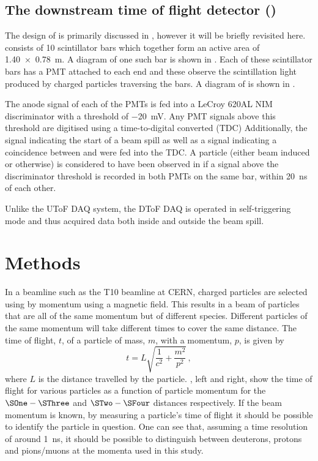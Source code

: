 \subsection{The downstream time of flight detector (\SFour)}
\label{sec:hptpc_beam_flux:overview:s4}

The design of \SFour is primarily discussed in , however it will be briefly revisited here.
\SFour consists of 10 scintillator bars which together form an active area of \SI{1.40 x 0.78}{\metre}.
A diagram of one such bar is shown in .
Each of these scintillator bars has a PMT attached to each end and these observe the scintillation light produced by charged particles traversing the bars.
A diagram of \SFour is shown in .

The anode signal of each of the PMTs is fed into a LeCroy 620AL NIM discriminator with a threshold of \SI{-20}{\milli\volt}.
Any PMT signals above this threshold are digitised using a time-to-digital converted (TDC)
Additionally, the signal indicating the start of a beam spill as well as a signal indicating a coincidence between \SOne and \STwo were fed into the TDC.
A particle (either beam induced or otherwise) is considered to have been observed in \SFour if a signal above the discriminator threshold is recorded in both PMTs on the same bar, within \SI{20}{\nano\second} of each other.

Unlike the UToF DAQ system, the DToF DAQ is operated in self-triggering mode and thus acquired data both inside and outside the beam spill.


\section{Methods}
\label{sec:hptpc_beam_flux:methods}

In a beamline such as the T10 beamline at CERN, charged particles are selected using by momentum using a magnetic field.
This results in a beam of particles that are all of the same momentum but of different species.
Different particles of the same momentum will take different times to cover the same distance.
The time of flight, $t$, of a particle of mass, $m$, with a momentum, $p$, is given by
\begin{equation}
  t = L \sqrt{ \frac{1}{c^{2}} + \frac{m^{2}}{p^{2}} }\, ,
  \label{eq:tof}
\end{equation}
where $L$ is the distance travelled by the particle.
, left and right, show the time of flight for various particles as a function of particle momentum for the $\SOne - \SThree$ and  $\STwo - \SFour$ distances respectively.
If the beam momentum is known, by measuring a particle's time of flight it should be possible to identify the particle in question.
One can see that, assuming a time resolution of around \SI{1}{\nano\second}, it should be possible to distinguish between deuterons, protons and pions/muons at the momenta used in this study.

